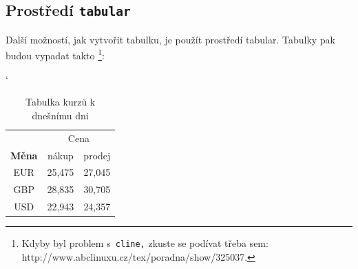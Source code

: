 \documentclass[a4paper, 11pt]{article}
\begin{document}
\subsection{Prostředí \texttt{tabular}}
\noindent Další možností, jak vytvořit tabulku, je použít prostředí tabular. Tabulky pak budou vypadat takto
\cprotect\footnote{Kdyby byl problem s\verb| cline,| zkuste se podívat třeba sem: 
http://www.abclinuxu.cz/tex/poradna/show/325037.}:
\bigskip
\begin{table}[h]
\catcode`
\centering
\begin{tabular}{|c|c|c|}
\hline
\textbf{}     & \multicolumn{2}{c|}{Cena} \\ \cline{2-3} 
\textbf{Měna} & nákup       & prodej      \\ \hline
EUR           & 25,475      & 27,045      \\
GBP           & 28,835      & 30,705      \\
USD           & 22,943      & 24,357      \\ \hline
\end{tabular}
\caption{Tabulka kurzů k dnešnímu dni}
\label{tab:meny}
\end{table}
\bigskip
\end{document}
